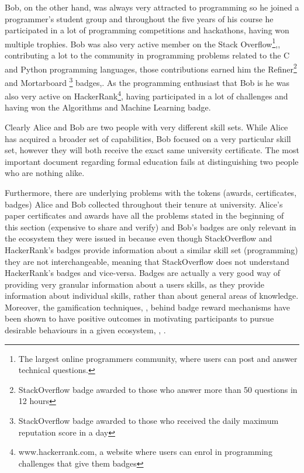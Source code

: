 \documentclass[llncsdoc]{llncs}
\begin{document}
Bob, on the other hand, was always very attracted to programming so he joined a programmer's student group and throughout the five years of his course he participated in a lot of programming competitions and hackathons, having won multiple trophies. Bob was also very active member on the Stack Overflow\footnote{The largest online programmers community, where users can post and answer technical questions.},\cite{stackoverflowcom:RUwG9opz}, contributing a lot to the community in programming problems related to the C and Python programming languages, those contributions earned him the Refiner\footnote{StackOverflow badge awarded to those who answer more than 50 questions in 12 hours} and Mortarboard \footnote{StackOverflow badge awarded to those who received the daily maximum reputation score in a day} badges,\cite{Anonymous:V-xylGNf}. As the programming enthusiast that Bob is he was also very active on HackerRank\footnote{www.hackerrank.com, a website where users can enrol in programming challenges that give them badges}, having participated in a lot of challenges and having won the Algorithms and Machine Learning badge.

Clearly Alice and Bob are two people with very different skill sets. While Alice has acquired a broader set of capabilities, Bob focused on a very particular skill set, however they will both receive the exact same university certificate. The most important document regarding formal education fails at distinguishing two people who are nothing alike.

Furthermore, there are underlying problems with the tokens (awards, certificates, badges) Alice and Bob collected throughout their tenure at university. Alice's paper certificates and awards have all the problems stated in the beginning of this section (expensive to share and verify) and Bob's badges are only relevant in the ecosystem they were issued in because even though StackOverflow and HackerRank's badges provide information about a similar skill set (programming) they are not interchangeable, meaning that StackOverflow does not understand HackerRank's badges and vice-versa. Badges are actually a very good way of providing very granular information about a users skills, as they provide information about individual skills, rather than about general areas of knowledge. Moreover, the gamification techniques, \cite{Deterding:2012wi}, behind badge reward mechanisms have been shown to have positive outcomes in motivating participants to pursue desirable behaviours in a given ecosystem, \cite{Hamari:2013ju}, \cite{Ibanez:2014cs}.
\end{document}
